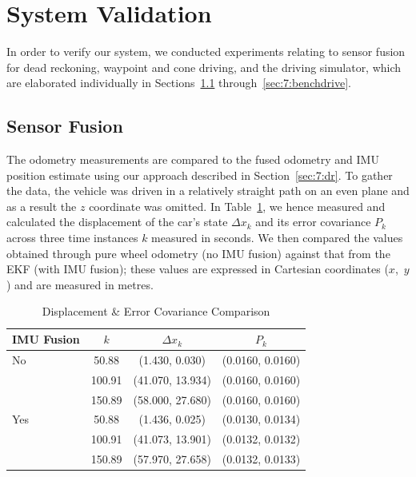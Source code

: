 \section{System Validation}\label{sec:7:bench}
In order to verify our system, we conducted experiments relating to sensor fusion for dead reckoning, waypoint and cone driving, and the driving simulator, which are elaborated individually in Sections~\ref{sec:7:sensorfusion} through~\ref{sec:7:benchdrive}.

\subsection{Sensor Fusion}\label{sec:7:sensorfusion}
The odometry measurements are compared to the fused odometry and IMU position estimate using our approach described in Section~\ref{sec:7:dr}. To gather the data, the vehicle was driven in a relatively straight path on an even plane and as a result the $z$ coordinate was omitted. In Table~\ref{tbl:7:odometry}, we hence measured and calculated the displacement of the car's state $\Delta x_k$ and its error covariance $P_k$ across three time instances $k$ measured in seconds. We then compared the values obtained through pure wheel odometry (no IMU fusion) against that from the EKF (with IMU fusion); these values are expressed in Cartesian coordinates ($x$,~$y$) and are measured in metres.


\begin{table}[H]
	\caption{Displacement \& Error Covariance Comparison}%
	\label{tbl:7:odometry}
	\centering
	\begin{tabular}{lccc}
		\toprule
		IMU Fusion & $k$ & $\Delta x_k$ & $P_k$\\
		\midrule
		No  & 50.88   & (1.430, 0.030)    & (0.0160, 0.0160)  \\
		& 100.91  & (41.070, 13.934)  & (0.0160, 0.0160)  \\
		& 150.89  & (58.000, 27.680)  & (0.0160, 0.0160)  \\
		\midrule
		Yes     & 50.88   & (1.436, 0.025)    & (0.0130, 0.0134)   \\
		& 100.91  & (41.073, 13.901)  & (0.0132, 0.0132)   \\
		& 150.89  & (57.970, 27.658)  & (0.0132, 0.0133)   \\
		\bottomrule
	\end{tabular}
\end{table}

